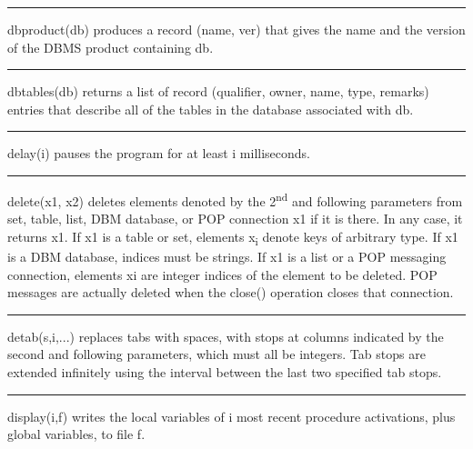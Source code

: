 \bigskip\hrule\vspace{0.1cm}

\noindent
dbproduct(db) produces a record (name, ver) that gives the name and the
version of the DBMS product containing db.

\bigskip\hrule\vspace{0.1cm}

\noindent
dbtables(db) returns a list of record (qualifier, owner, name, type,
remarks) entries that describe all of the tables in the database
associated with db.

\bigskip\hrule\vspace{0.1cm}

\noindent
{}delay(i) pauses the program for at least i milliseconds.

\bigskip\hrule\vspace{0.1cm}

\noindent
{}delete(x1, x2) deletes elements denoted by the
2\textsuperscript{nd} and following parameters from set, table, list,
DBM database, or POP connection x1 if it is there. In any case, it
returns x1. If x1 is a table or set, elements x\textsubscript{i} denote
keys of arbitrary type. If x1 is a DBM database, indices must be
strings. If x1 is a list or a POP messaging connection, elements xi are
integer indices of the element to be deleted. POP messages are actually
deleted when the close() operation closes that connection.

\bigskip\hrule\vspace{0.1cm}

\noindent
detab(s,i,...) replaces tabs with spaces, with stops at columns
indicated by the second and following parameters, which must all be
integers. Tab stops are extended infinitely using the interval between
the last two specified tab stops.

\bigskip\hrule\vspace{0.1cm}

\noindent
{}display(i,f) writes the local variables of i most
recent procedure activations, plus global variables, to file f.

